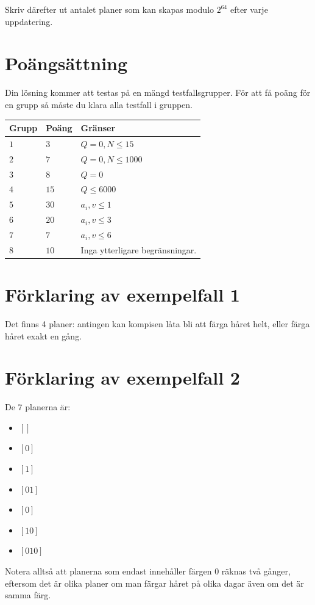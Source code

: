 Skriv därefter ut antalet planer som kan skapas modulo $2^{64}$ efter varje uppdatering.

\section*{Poängsättning}
Din lösning kommer att testas på en mängd testfallsgrupper.
För att få poäng för en grupp så måste du klara alla testfall i gruppen.

\noindent
\begin{tabular}{| l | l | p{12cm} |}
  \hline
  \textbf{Grupp} & \textbf{Poäng} & \textbf{Gränser} \\ \hline
  $1$    & $3$        & $Q=0, N \leq 15$ \\ \hline
  $2$    & $7$        & $Q=0, N \leq 1000$ \\ \hline
  $3$    & $8$        & $Q=0$ \\ \hline
  $4$    & $15$       & $Q \leq 6000$ \\ \hline
  $5$    & $30$       & $a_i, v \leq 1$ \\ \hline
  $6$    & $20$       & $a_i, v \leq 3$ \\ \hline
  $7$    & $7$        & $a_i, v \leq 6$ \\ \hline
  $8$    & $10$       & Inga ytterligare begränsningar. \\ \hline
\end{tabular}


\section*{Förklaring av exempelfall 1}
Det finns 4 planer: antingen kan kompisen låta bli att färga håret helt, eller färga håret exakt en gång.

\section*{Förklaring av exempelfall 2}
De 7 planerna är:
\begin{itemize}
  \item $[]$
  \item $[0]$
  \item $[1]$
  \item $[0 1]$
  \item $[0]$
  \item $[1 0]$
  \item $[0 1 0]$
\end{itemize}
Notera alltså att planerna som endast innehåller färgen $0$ räknas två gånger, eftersom det är olika planer
om man färgar håret på olika dagar även om det är samma färg.
